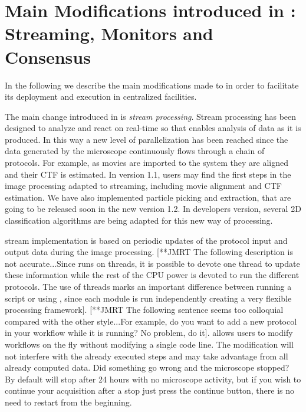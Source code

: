 \section{Main Modifications introduced in  \scipion: Streaming, Monitors and Consensus}
\label{overall}

In the following we describe the main modifications made to \scipion in order to facilitate its deployment and execution in centralized facilities. 

The main change introduced in \scipion is \emph{stream processing}. Stream processing has been designed to analyze and react on real-time so that enables analysis of data as it is produced.
In this way a new level of parallelization has been reached since the  data generated by the microscope continuously flows through a chain of protocols. For example, as movies are imported to the system they are aligned and their CTF is estimated. In \scipion version 1.1, users may find  the first steps in the image processing adapted to streaming, including movie alignment and CTF estimation. We have also implemented particle picking and extraction, that are going to be released soon in the new version 1.2. In developers version, several 2D classification algorithms are being adapted for this new way of processing.

\scipion stream implementation is based on periodic updates of the protocol input and output data during the image processing. 
[**JMRT The following description is not accurate...Since \scipion runs on threads, it is possible to devote one thread to update these information while the rest of the CPU power is devoted to run the different protocols. The use of threads marks an important difference between running a script or using \scipion, since  each module is run independently creating a very flexible processing framework]. [**JMRT The following sentence seems too colloquial compared with the other style...For example, do you want to add a new protocol in your workflow while it is running? No problem, do it]. \scipion allows users to modify  workflows on the fly without modifying a single code line. The modification will not interfere with the already executed steps and may take advantage from all already computed data. Did something go wrong and the microscope stopped? By default \scipion will stop after 24 hours with no microscope activity, but if you wish to continue your acquisition after a stop just press the continue button, there is no need to restart from the beginning. 



